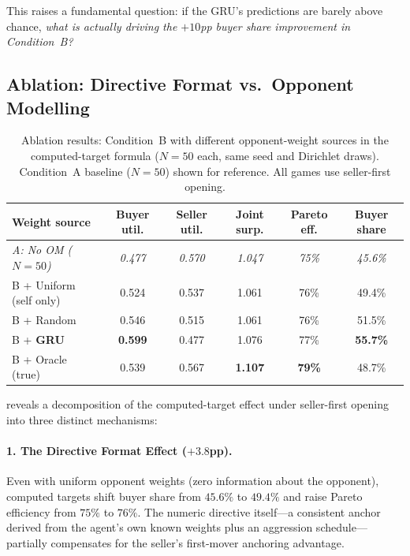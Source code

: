 \documentclass[11pt,a4paper]{article}
\begin{document}
This raises a fundamental question: if the GRU's predictions are barely above chance, \emph{what is actually driving the $+10$pp buyer share improvement in Condition~B?}

\subsection{Ablation: Directive Format vs.\ Opponent Modelling}
\label{sec:ablation_results}

\begin{table}[t]
\centering
\caption{Ablation results: Condition~B with different opponent-weight sources in the computed-target formula ($N = 50$ each, same seed and Dirichlet draws). Condition~A baseline ($N = 50$) shown for reference. All games use seller-first opening.}
\label{tab:ablation}
\small
\begin{tabular}{lccccc}
\toprule
Weight source & Buyer util. & Seller util. & Joint surp. & Pareto eff. & Buyer share \\
\midrule
\emph{A: No OM ($N\!=\!50$)} & \emph{0.477} & \emph{0.570} & \emph{1.047} & \emph{75\%} & \emph{45.6\%} \\
\midrule
B + Uniform (self only) & 0.524 & 0.537 & 1.061 & 76\% & 49.4\% \\
B + Random & 0.546 & 0.515 & 1.061 & 76\% & 51.5\% \\
B + \textbf{GRU} & \textbf{0.599} & 0.477 & 1.076 & 77\% & \textbf{55.7\%} \\
B + Oracle (true) & 0.539 & 0.567 & \textbf{1.107} & \textbf{79\%} & 48.7\% \\
\bottomrule
\end{tabular}
\end{table}

 reveals a decomposition of the computed-target effect under seller-first opening into three distinct mechanisms:

\paragraph{1. The Directive Format Effect ($+3.8$pp).}
Even with uniform opponent weights (zero information about the opponent), computed targets shift buyer share from $45.6\%$ to $49.4\%$ and raise Pareto efficiency from $75\%$ to $76\%$. The numeric directive itself---a consistent anchor derived from the agent's own known weights plus an aggression schedule---partially compensates for the seller's first-mover anchoring advantage.
\end{document}
